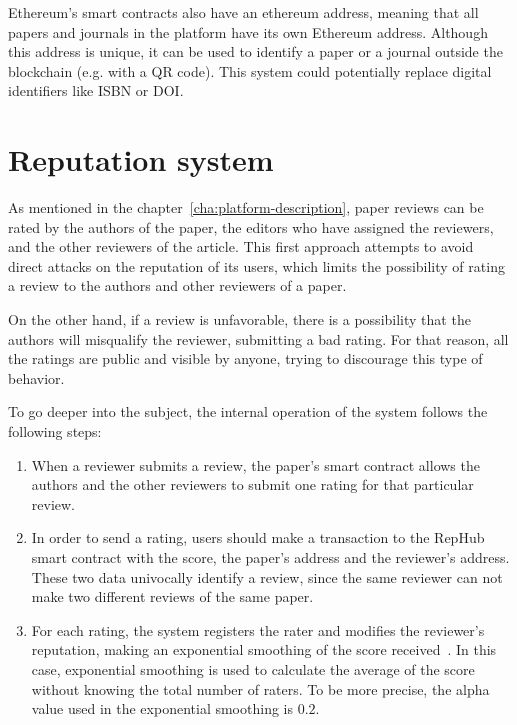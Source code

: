 
Ethereum's smart contracts also have an ethereum address, meaning that all
papers and journals in the platform have its own Ethereum address. Although this
address is unique, it can be used to identify a paper or a journal outside the
blockchain (e.g. with a QR code). This system could potentially replace digital
identifiers like ISBN or DOI.

\section{Reputation system}
\label{rep:system}

As mentioned in the chapter~\ref{cha:platform-description}, paper reviews can be
rated by the authors of the paper, the editors who have assigned the reviewers,
and the other reviewers of the article. This first approach attempts to avoid
direct attacks on the reputation of its users, which limits the possibility of
rating a review to the authors and other reviewers of a paper.

On the other hand, if a review is unfavorable, there is a possibility that the
authors will misqualify the reviewer, submitting a bad rating. For that reason,
all the ratings are public and visible by anyone, trying to discourage this type
of behavior.

To go deeper into the subject, the internal operation of the system follows the
following steps:

\begin{enumerate}
\item When a reviewer submits a review, the paper's smart contract allows the
  authors and the other reviewers to submit one rating for that particular
  review.
  
\item In order to send a rating, users should make a transaction to the RepHub
  smart contract with the score, the paper's address and the reviewer's address.
  These two data univocally identify a review, since the same reviewer can not
  make two different reviews of the same paper.
  
\item For each rating, the system registers the rater and modifies the
  reviewer's reputation, making an exponential smoothing of the score
  received~\cite{gardner1985exponential}. In this case, exponential smoothing is
  used to calculate the average of the score without knowing the total number of
  raters. To be more precise, the alpha value used in the exponential smoothing
  is $0.2$.
\end{enumerate}

